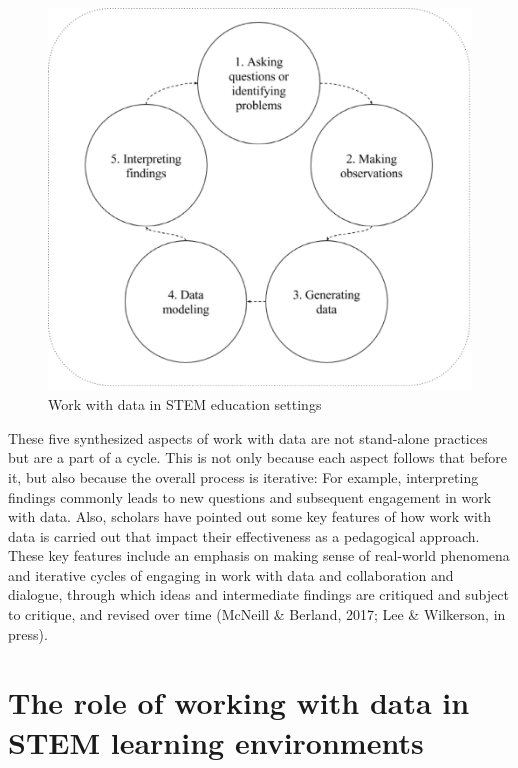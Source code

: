 \documentclass[]{msu-thesis}
\theoremstyle{definition}
\theoremstyle{definition}
\theoremstyle{definition}
\theoremstyle{remark}
\begin{document}
\begin{figure}

{\centering \includegraphics[width=0.8\linewidth]{images/figure1} 

}

\caption{Work with data in STEM education settings}\label{fig:unnamed-chunk-1}
\end{figure}

These five synthesized aspects of work with data are not stand-alone
practices but are a part of a cycle. This is not only because each
aspect follows that before it, but also because the overall process is
iterative: For example, interpreting findings commonly leads to new
questions and subsequent engagement in work with data. Also, scholars
have pointed out some key features of how work with data is carried out
that impact their effectiveness as a pedagogical approach. These key
features include an emphasis on making sense of real-world phenomena and
iterative cycles of engaging in work with data and collaboration and
dialogue, through which ideas and intermediate findings are critiqued
and subject to critique, and revised over time (McNeill \& Berland,
2017; Lee \& Wilkerson, in press).

\section{The role of working with data in STEM learning
environments}\label{the-role-of-working-with-data-in-stem-learning-environments}
\end{document}
